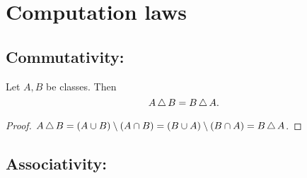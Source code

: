 \documentclass[../set-theory.tex]{subfiles}
\begin{document}
  \section{Computation laws}

  \subsection*{Commutativity:}

  \begin{forthel}
    \begin{proposition}
      Let $A, B$ be classes.
      Then \[ A \mathop{\triangle} B = B \mathop{\triangle} A. \]
    \end{proposition}
    \begin{proof}
      $A \mathop{\triangle} B =
      (A \cup B) \setminus (A \cap B) =
      (B \cup A) \setminus (B \cap A) =
      B \mathop{\triangle} A$.
    \end{proof}
  \end{forthel}


  \subsection*{Associativity:}
\end{document}
